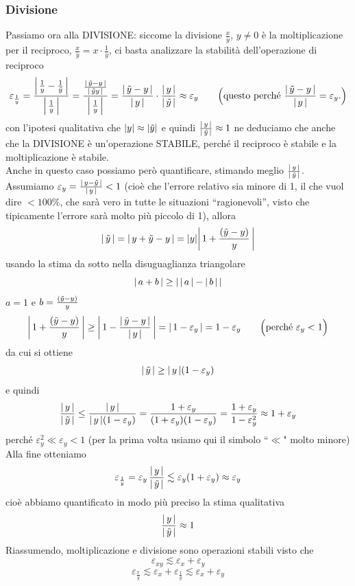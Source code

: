 \subsubsection{Divisione}
Passiamo ora alla DIVISIONE: siccome la divisione $\frac{x}{y}, \, y \ne 0$ è la moltiplicazione per il reciproco, $\frac{x}{y} = x \cdot \frac{1}{y}$, ci basta analizzare la stabilità dell'operazione di reciproco
\[ \varepsilon_{\frac{1}{y}} = \frac{\abs*{\,\frac{1}{y} - \frac{1}{\Tilde{y}}\,} }{\abs*{\,\frac{1}{y}\,}} = \frac{\frac{\abs*{\,\Tilde{y} - y\,}}{\abs*{\,\Tilde{y}y\,}}}{\abs*{\,\frac{1}{y}\,}} = \frac{\abs*{\,\Tilde{y} - y\,}}{\abs*{\,y\,}} \cdot \frac{\abs*{\,y\,}}{\abs*{\,\Tilde{y}\,}} \approx \varepsilon_y \qquad \Bigl( \text{questo perché } \frac{\abs*{\,\Tilde{y} - y\,}}{\abs*{\,y\,}} = \varepsilon_y . \Bigr)\]
con l'ipotesi qualitativa che $\abs{y} \approx \abs{\Tilde{y}}$ e quindi $\frac{\abs*{\,y\,}}{\abs*{\,\Tilde{y}\,}} \approx 1$ ne deduciamo che anche che la DIVISIONE è un'operazione STABILE, perché il reciproco è stabile e la moltiplicazione è stabile.\\
Anche in questo caso possiamo però quantificare, stimando meglio $\frac{\abs*{\,y\,}}{\abs*{\,\Tilde{y}\,}}$.\\ 
Assumiamo $\varepsilon_y = \frac{\abs*{\,y - \Tilde{y}\,}}{\abs*{\,y\,}} < 1$ (cioè che l'errore relativo sia minore di 1, il che vuol dire $< 100\%$, che sarà vero in tutte le situazioni “ragionevoli”, visto che tipicamente l'errore sarà molto più piccolo di 1), allora 
\[ \abs{\,\Tilde{y}\,} = \abs{\,y + \Tilde{y} - y\,} = \abs{y}\abs*{\,1 + \frac{(\Tilde{y} - y)}{y}\,}\]
usando la stima da sotto nella disuguaglianza triangolare 
\[\abs{\, a + b\,} \ge \abs{\,\abs{\,a\,} - \abs{\,b\,}\,}\]
$a = 1$ e $b = \frac{(\Tilde{y} - y)}{y}$
\[\abs*{\,1 + \frac{(\Tilde{y} - y)}{y}\,} \ge \abs*{\,1 - \frac{\abs*{\,\Tilde{y} - y\,}}{\abs{\,y\,}}\,} = \abs*{\,1 - \varepsilon_y\,} = 1 - \varepsilon_y \qquad \Bigl( \text{perché } \varepsilon_y < 1 \Bigr)\]
da cui si ottiene 
\[\abs{\,\Tilde{y}\,} \ge \abs{\,y\,}(1 - \varepsilon_y)\]
e quindi
\[\frac{\abs*{\,y\,}}{\abs*{\,\Tilde{y}\,}} \le \frac{\abs*{\,y\,}}{\abs{\,y\,}(1 - \varepsilon_y)} = \frac{1 + \varepsilon_y}{(1 + \varepsilon_y)(1 - \varepsilon_y)} = \frac{1 + \varepsilon_y}{1 - \varepsilon_y^2} \approx 1 + \varepsilon_y\]
perché $\varepsilon_y^2 \ll \varepsilon_y < 1$ (per la prima volta usiamo qui il simbolo ``$\ll$" molto minore) \\
Alla fine otteniamo
\[\varepsilon_{\frac{1}{y}} = \varepsilon_y\,\frac{\abs{\,y\,}}{\abs{\,\Tilde{y}\,}} \lesssim \varepsilon_y (1 + \varepsilon_y) \approx \varepsilon_y\]
cioè abbiamo quantificato in modo più preciso la stima qualitativa 
\[\frac{\abs*{\,y\,}}{\abs*{\,\Tilde{y}\,}} \approx 1\]
Riassumendo, moltiplicazione e divisione sono operazioni stabili visto che 
\[\varepsilon_{xy} \lesssim \varepsilon_x + \varepsilon_y\]
\[\varepsilon_{\frac{x}{y}} \lesssim \varepsilon_x + \varepsilon_{\frac{1}{y}} \lesssim  \varepsilon_x + \varepsilon_y\]

